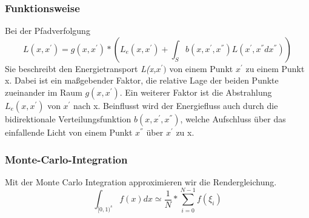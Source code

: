 \subsubsection{Funktionsweise}
Bei der Pfadverfolgung
    \cite{kajiya1986rendering}
    \begin{equation}
        L(x,{x}^{'}) = g(x,{x}^{'}) * (L_{e}(x,{x}^{'}) + 
                        \int_{S}^{} b(x,{x}^{'},{x}^{''})
                        L({x}^{'},{x}^{''}d{x}^{''})) 
    \end{equation}
    Sie beschreibt den Energietransport \textit{L(x,${x}^{'})$} von einem Punkt ${x}^{'}$
    zu einem Punkt x. Dabei ist ein maßgebender Faktor, die relative Lage der beiden Punkte
    zueinander im Raum $g(x,{x}^{'})$. Ein weiterer Faktor ist die Abstrahlung 
    $L_{e}(x,{x}^{'})$ von ${x}^{'}$ nach x. Beinflusst wird der Energiefluss auch durch
    die bidirektionale Verteilungsfunktion $b(x,{x}^{'},{x}^{''})$, welche Aufschluss über
    das einfallende Licht von einem Punkt ${x}^{''}$ über ${x}^{'}$ zu x.

\subsubsection{Monte-Carlo-Integration}
    Mit der Monte Carlo Integration approximieren wir die Rendergleichung.
    \cite{KK02}
    \label{pic:MonteCarloIntegration}
    \begin{equation}
    \int_{{[0,1)}^s} f(x) dx \simeq \frac{1}{N}*\sum_{i=0}^{N-1}f(\xi_i)
    \end{equation}


